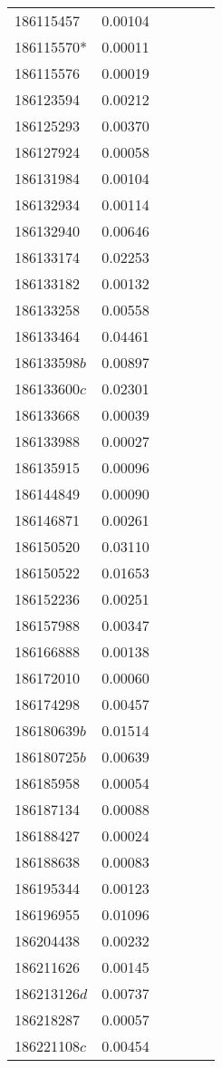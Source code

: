\begin{landscape}
\begin{longtable}{p{1.6cm}p{1.2cm}p{1.5cm}p{1.5cm}p{2.8cm}p{13.5cm}}
186115457&0.00104&&&& \\
186115570*&0.00011&&&& \\
186115576&0.00019&&&& \\
186123594&0.00212&&&& \\
186125293&0.00370&&&& \\
186127924&0.00058&&&& \\
186131984&0.00104&&&& \\
186132934&0.00114&&&& \\
186132940&0.00646&&&& \\
186133174&0.02253&&&& \\
186133182&0.00132&&&& \\
186133258&0.00558&&&& \\
186133464&0.04461&&&& \\
186133598$b$&0.00897&&&& \\
186133600$c$&0.02301&&&& \\
186133668&0.00039&&&& \\
186133988&0.00027&&&& \\
186135915&0.00096&&&& \\
186144849&0.00090&&&& \\
186146871&0.00261&&&& \\
186150520&0.03110&&&& \\
186150522&0.01653&&&& \\
186152236&0.00251&&&& \\
186157988&0.00347&&&& \\
186166888&0.00138&&&& \\
186172010&0.00060&&&& \\
186174298&0.00457&&&& \\
186180639$b$&0.01514&&&& \\
186180725$b$&0.00639&&&& \\
186185958&0.00054&&&& \\
186187134&0.00088&&&& \\
186188427&0.00024&&&& \\
186188638&0.00083&&&& \\
186195344&0.00123&&&& \\
186196955&0.01096&&&& \\
186204438&0.00232&&&& \\
186211626&0.00145&&&& \\
186213126$d$&0.00737&&&& \\
186218287&0.00057&&&& \\
186221108$c$&0.00454&&&& \\

\end{longtable}
\end{landscape}
